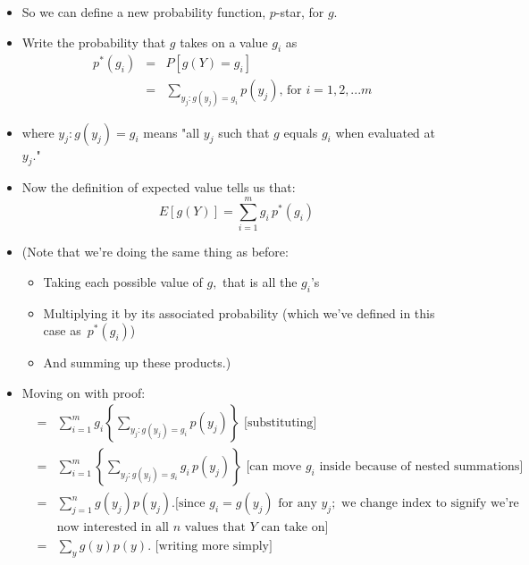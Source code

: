 \documentclass[11pt]{article}
\begin{document}
\begin{itemize}
\begin{itemize}
\item So we can define a new probability function, $p$-star, for $g.$ \ 

\item Write the probability that $g$ takes on a value $g_{i}$ as%
\begin{eqnarray*}
p^{\ast }(g_{i}) &=&P[g(Y)=g_{i}] \\
&=&\sum_{y_{j}:g(y_{j})=g_{i}}p(y_{j})\text{, for }i=1,2,...m\text{ \ }
\end{eqnarray*}

\item where $y_{j}:g(y_{j})=g_{i}$ means "all $y_{j}$ such that $g$ equals $%
g_{i}$ when evaluated at $y_{j}.$"

\item Now the definition of expected value tells us that:%
\begin{equation*}
E[g(Y)]=\sum_{i=1}^{m}g_{i}\,p^{\ast }(g_{i})
\end{equation*}

\item (Note that we're doing the same thing as before:

\begin{itemize}
\item Taking each possible value of $g,$ that is all the $g_{i}$'s

\item Multiplying it by its associated probability (which we've defined in
this case as $\,p^{\ast }(g_{i})$)

\item And summing up these products.)
\end{itemize}

\item Moving on with proof:%
\begin{eqnarray*}
&=&\sum_{i=1}^{m}g_{i}\left\{ \sum_{y_{j}:g(y_{j})=g_{i}}p(y_{j})\right\} 
\text{ [substituting]} \\
&=&\sum_{i=1}^{m}\left\{ \sum_{y_{j}:g(y_{j})=g_{i}}g_{i}\,p(y_{j})\right\} 
\text{ [can move }g_{i}\text{ inside because of nested summations] } \\
&=&\sum_{j=1}^{n}g(y_{j})p(y_{j}).\text{[since }g_{i}=g(y_{j})\text{ for any 
}y_{j};\text{ we change index to signify we're} \\
&&\text{now interested in all }n\text{ values that }Y\text{ can take on]} \\
&=&\sum_{y}g(y)p(y).\text{ \ [writing more simply]}
\end{eqnarray*}


\end{itemize}
\end{itemize}
\end{document}
